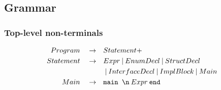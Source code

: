 \documentclass[a4paper, 12pt]{article}
\newcommand{\sepbar}{\: | \:}	%
\newcommand{\substo}{\quad\rightarrow\quad}
\renewcommand{\tt}{\texttt}
\begin{document}


\subsection{Grammar}
\subsubsection{Top-level non-terminals}
\begin{align*}
Program \substo& Statement+\\
Statement \substo& Expr \sepbar EnumDecl \sepbar StructDecl\\
&\sepbar InterfaceDecl \sepbar ImplBlock \sepbar Main\\
Main \substo& \tt{main \symbol{92}n}\: Expr \: \tt{end}
\end{align*}
\end{document}
